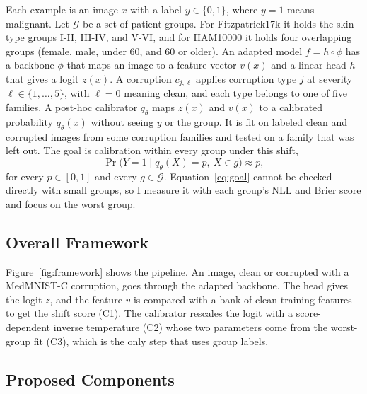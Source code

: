 \documentclass[sigconf,nonacm]{acmart}
\begin{document}
Each example is an image $x$ with a label $y \in \{0,1\}$, where $y = 1$ means malignant. Let $\mathcal{G}$ be a set of patient groups. For Fitzpatrick17k it holds the skin-type groups I-II, III-IV, and V-VI, and for HAM10000 it holds four overlapping groups (female, male, under 60, and 60 or older). An adapted model $f = h \circ \phi$ has a backbone $\phi$ that maps an image to a feature vector $v(x)$ and a linear head $h$ that gives a logit $z(x)$. A corruption $c_{j,\ell}$ applies corruption type $j$ at severity $\ell \in \{1, \dots, 5\}$, with $\ell = 0$ meaning clean, and each type belongs to one of five families. A post-hoc calibrator $q_\theta$ maps $z(x)$ and $v(x)$ to a calibrated probability $q_\theta(x)$ without seeing $y$ or the group. It is fit on labeled clean and corrupted images from some corruption families and tested on a family that was left out. The goal is calibration within every group under this shift,
\begin{equation}
  \Pr\big(Y = 1 \mid q_\theta(X) = p,\ X \in g\big) \approx p,
  \label{eq:goal}
\end{equation}
for every $p \in [0,1]$ and every $g \in \mathcal{G}$. Equation~\eqref{eq:goal} cannot be checked directly with small groups, so I measure it with each group's NLL and Brier score and focus on the worst group.

\subsection{Overall Framework}

Figure~\ref{fig:framework} shows the pipeline. An image, clean or corrupted with a MedMNIST-C corruption, goes through the adapted backbone. The head gives the logit $z$, and the feature $v$ is compared with a bank of clean training features to get the shift score (C1). The calibrator rescales the logit with a score-dependent inverse temperature (C2) whose two parameters come from the worst-group fit (C3), which is the only step that uses group labels.

\subsection{Proposed Components}
\label{sec:components}
\end{document}
